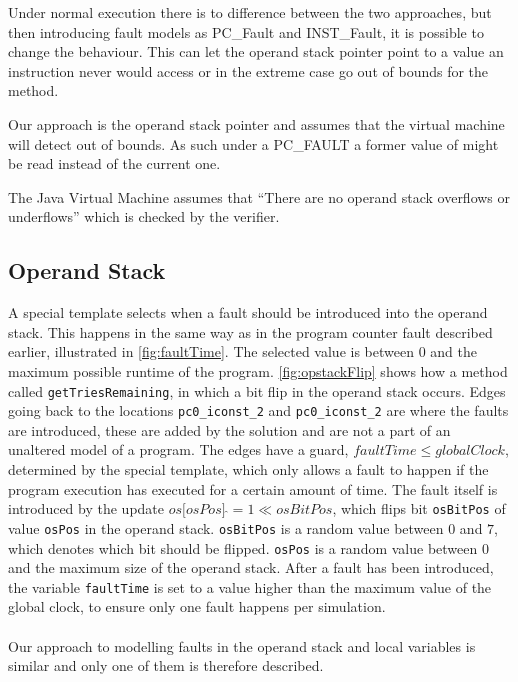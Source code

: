 Under normal execution there is to difference between the two approaches, but then introducing fault models as PC\_Fault and INST\_Fault, it is possible to change the behaviour. This can let the operand stack pointer point to a value an instruction never would access or in the extreme case go out of bounds for the method.

Our approach is the operand stack pointer and assumes that the virtual machine will detect out of bounds. As such under a PC\_FAULT a former value of might be read instead of the current one.

The Java Virtual Machine assumes that ``There are no operand stack overflows or underflows'' \cite[c. 4.10]{java_spec} which is checked by the verifier.

\subsection{Operand Stack}
A special template selects when a fault should be introduced into the operand stack. This happens in the same way as in the program counter fault described earlier, illustrated in \cref{fig:faultTime}. The selected value is between $0$ and the maximum possible runtime of the program. \cref{fig:opstackFlip} shows how a method called \texttt{getTriesRemaining}, in which a bit flip in the operand stack occurs. Edges going back to the locations \texttt{pc0\_iconst\_2} and \texttt{pc0\_iconst\_2} are where the faults are introduced, these are added by the solution and are not a part of an unaltered model of a program. The edges have a guard, $faultTime \leq globalClock$, determined by the special template, which only allows a fault to happen if the program execution has executed for a certain amount of time. The fault itself is introduced by the update $os\lbrack osPos \rbrack\:\hat{}= 1 \ll osBitPos$, which flips bit \texttt{osBitPos} of value \texttt{osPos} in the operand stack. \texttt{osBitPos} is a random value between $0$ and $7$, which denotes which bit should be flipped. \texttt{osPos} is a random value between $0$ and the maximum size of the operand stack. After a fault has been introduced, the variable \texttt{faultTime} is set to a value higher than the maximum value of the global clock, to ensure only one fault happens per simulation.\\\\
Our approach to modelling faults in the operand stack and local variables is similar and only one of them is therefore described.
